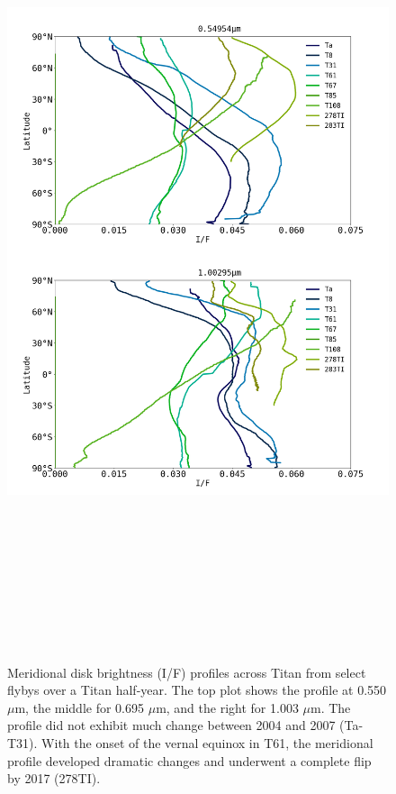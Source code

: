 \documentclass[apj,tighten]{emulateapj}
\begin{document}
\begin{figure}[h]
\centering
\includegraphics[height = 24cm, keepaspectratio]{figures/IF.png}
\caption{\footnotesize Meridional disk brightness (I/F) profiles across Titan from select flybys over a Titan half-year. The top plot shows the profile at 0.550 $\mu$m, the middle for 0.695 $\mu$m, and the right for 1.003 $\mu$m. The profile did not exhibit much change between 2004 and 2007 (Ta-T31). With the onset of the vernal equinox in T61, the meridional profile developed dramatic changes and underwent a complete flip by 2017 (278TI).
\label{figure:ifAcrossFlybys}}
\end{figure}
\end{document}
